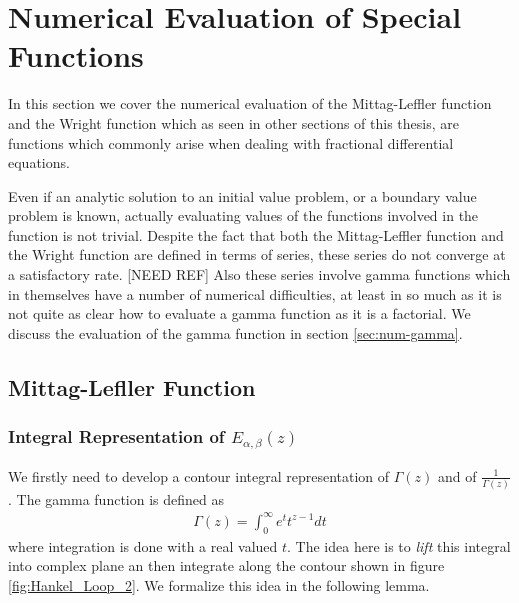 \section{Numerical Evaluation of Special Functions}

In this section we cover the numerical evaluation of the Mittag-Leffler function and the Wright function
which as seen in other sections of this thesis, are functions which commonly arise when dealing with
fractional differential equations.

Even if an analytic solution to an initial value problem, or a boundary value problem is known, actually
evaluating values of the functions involved in the function is not trivial. Despite the fact that both
the Mittag-Leffler function and the Wright function are defined in terms of series, these series do not 
converge at a satisfactory rate. [NEED REF] Also these series involve gamma functions which in themselves
have a number of numerical difficulties, at least in so much as it is not quite as clear how to evaluate 
a gamma function as it is a factorial. We discuss the evaluation of the gamma function in section \ref{sec:num-gamma}.


\subsection{Mittag-Lefller Function}
\subsubsection{Integral Representation of $ E_{\alpha,\beta}(z) $}

We firstly need to develop a contour integral representation of $ \Gamma(z) $ and of $ \frac{1}{\Gamma(z)} $.
The gamma function is defined as
\begin{align}
    \Gamma(z) = \int_0^\infty e^t t^{z-1} dt
\end{align}
where integration is done with a real valued $ t $. The idea here is to \emph{lift} this integral into
complex plane an then integrate along the contour shown in figure \ref{fig:Hankel_Loop_2}. We formalize 
this idea in the following lemma.

